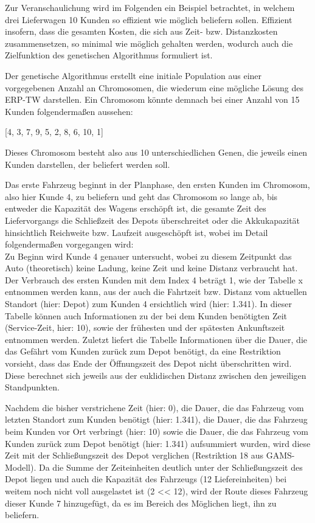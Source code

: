 \documentclass[a4paper,12pt,parskip,bibtotoc,liststotoc]{article}
\begin{document}
Zur Veranschaulichung wird im Folgenden ein Beispiel betrachtet, in welchem drei Lieferwagen 10 Kunden so effizient wie möglich beliefern sollen.
Effizient insofern, dass die gesamten Kosten, die sich aus Zeit- bzw. Distanzkosten zusammensetzen, so minimal wie möglich gehalten werden, wodurch auch die Zielfunktion des genetischen Algorithmus formuliert ist. 

Der genetische Algorithmus erstellt eine initiale Population aus einer vorgegebenen Anzahl an Chromosomen, die wiederum eine mögliche Lösung des ERP-TW darstellen. 
Ein Chromosom könnte demnach bei einer Anzahl von 15 Kunden folgendermaßen aussehen:

\begin{center}
[4, 3, 7, 9, 5, 2, 8, 6, 10, 1]

\end{center}

Dieses Chromosom besteht also aus 10 unterschiedlichen Genen, die jeweils einen Kunden darstellen, der beliefert werden soll.
 
Das erste Fahrzeug beginnt in der Planphase, den ersten Kunden im Chromosom, also hier Kunde 4, zu beliefern und geht das Chromosom so lange ab, bis entweder die Kapazität des Wagens erschöpft ist, die gesamte Zeit des Liefervorgangs die Schließzeit des Depots überschreitet oder die Akkukapazität hinsichtlich Reichweite bzw. Laufzeit ausgeschöpft ist, wobei im Detail folgendermaßen vorgegangen wird:\\
 
Zu Beginn wird Kunde 4 genauer untersucht, wobei zu diesem Zeitpunkt das Auto (theoretisch) keine Ladung, keine Zeit und keine Distanz verbraucht hat.
Der Verbrauch des ersten Kunden mit dem Index 4 beträgt 1, wie der Tabelle x entnommen werden kann, aus der auch die Fahrtzeit bzw. Distanz vom aktuellen Standort (hier: Depot) zum Kunden 4 ersichtlich wird (hier: 1.341).
In dieser Tabelle können auch Informationen zu der bei dem Kunden benötigten Zeit (Service-Zeit, hier: 10), sowie der frühesten und der spätesten Ankunftszeit entnommen werden.
Zuletzt liefert die Tabelle Informationen über die Dauer, die das Gefährt vom Kunden zurück zum Depot benötigt, da eine Restriktion vorsieht, dass das Ende der Öffnungszeit des Depot nicht überschritten wird.
Diese berechnet sich jeweils aus der euklidischen Distanz zwischen den jeweiligen Standpunkten.

Nachdem die bisher verstrichene Zeit (hier: 0), die Dauer, die das Fahrzeug vom letzten Standort zum Kunden benötigt (hier: 1.341), die Dauer, die das Fahrzeug beim Kunden vor Ort verbringt (hier: 10) sowie die Dauer, die das Fahrzeug vom Kunden zurück zum Depot benötigt (hier: 1.341) aufsummiert wurden, wird diese Zeit mit der Schließungszeit des Depot verglichen (Restriktion 18 aus GAMS-Modell). 
Da die Summe der Zeiteinheiten deutlich unter der Schließungszeit des Depot liegen und auch die Kapazität des Fahrzeugs (12 Liefereinheiten) bei weitem noch nicht voll ausgelastet ist (2 << 12), wird der Route dieses Fahrzeug dieser Kunde 7 hinzugefügt, da es im Bereich des Möglichen liegt, ihn zu beliefern.
\end{document}
